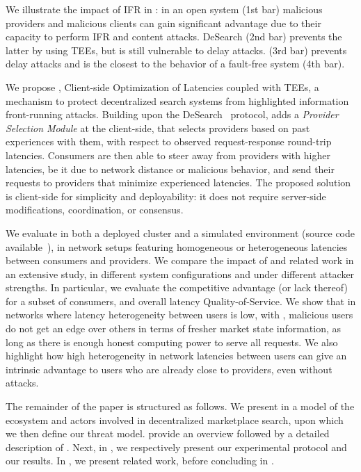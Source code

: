 We illustrate the impact of IFR in : 
in an open system (1st bar) malicious providers and malicious clients can gain significant advantage due to their capacity to perform IFR and content attacks. 
DeSearch (2nd bar) prevents the latter by using TEEs, but is still vulnerable to delay attacks. 
\sysname (3rd bar) prevents delay attacks and is the closest to the behavior of a fault-free system (4th bar).

We propose \sysname, Client-side Optimization of Latencies coupled with TEEs, a mechanism to protect decentralized search systems from highlighted information front-running attacks.
Building upon the DeSearch~\cite{liBringingDecentralizedSearch2021} protocol, \sysname adds a \emph{Provider Selection Module} at the client-side, that selects providers based on past experiences with them, with respect to observed request-response round-trip latencies. 
Consumers are then able to steer away from providers with higher latencies, be it due to network distance or malicious behavior, and send their requests to providers that minimize experienced latencies. 
The proposed solution is client-side for simplicity and deployability: it does not require server-side modifications, coordination, or consensus.

We evaluate \sysname in both a deployed cluster and a simulated environment (source code available~\cite{coolTEEcode}), in network setups featuring homogeneous or heterogeneous latencies between consumers and providers.
We compare the impact of \sysname and related work in an extensive study, in different system configurations and under different attacker strengths.
In particular, we evaluate the competitive advantage (or lack thereof) for a subset of consumers, and overall latency Quality-of-Service.
We show that in networks where latency heterogeneity between users is low, with \sysname, malicious users do not get an edge over others in terms of fresher market state information, as long as there is enough honest computing power to serve all requests. 
We also highlight how high heterogeneity in network latencies between users can give an intrinsic advantage to users who are already close to providers, even without attacks.

The remainder of the paper is structured as follows. 
We present in  a model of the ecosystem and actors involved in decentralized marketplace search, upon which we then define our threat model. 
 provide an overview followed by a detailed description of \sysname. 
Next, in , we respectively present our experimental protocol and our results.
In , we present related work, before concluding in .
